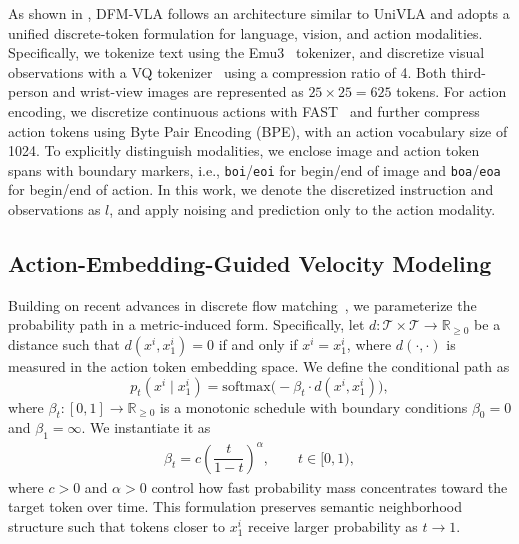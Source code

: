 As shown in , 
DFM-VLA follows an architecture similar to UniVLA and adopts a unified discrete-token formulation for language, vision, and action modalities.
Specifically, we tokenize text using the Emu3~\citep{wang2024emu3} tokenizer, and discretize visual observations with a VQ tokenizer~\citep{zheng2022movq} using a compression ratio of 4. Both third-person and wrist-view images are represented as $25\times25=625$ tokens. For action encoding, we discretize continuous actions with FAST~\citep{pertsch2025fast} and further compress action tokens using Byte Pair Encoding (BPE), with an action vocabulary size of 1024. 
To explicitly distinguish modalities, we enclose image and action token spans with boundary markers, i.e., \texttt{boi}/\texttt{eoi} for begin/end of image and \texttt{boa}/\texttt{eoa} for begin/end of action.
In this work, we denote the discretized instruction and observations as $l$, and apply noising and prediction only to the action modality.

\subsection{Action-Embedding-Guided Velocity Modeling}
\label{sec:Embed_vel}

Building on recent advances in discrete flow matching~\citep{gat2024discrete,wang2025fudoki,deng2025uniform}, we parameterize the probability path in a metric-induced form. 
Specifically, let \( d : \mathcal{T} \times \mathcal{T} \to \mathbb{R}_{\geq 0} \) be a distance such that \( d(x^i, x_1^i) = 0 \) if and only if \( x^i = x_1^i \), where \( d(\cdot, \cdot) \) is measured in the action token embedding space. We define the conditional path as
\begin{equation}
p_t(x^i \mid x_1^i) = \mathrm{softmax}\big( -\beta_t \cdot d(x^i, x_1^i) \big),
\label{eq:diffusion-softmax}
\end{equation}
where $\beta_t:[0,1] \to \mathbb{R}_{\ge 0}$ is a monotonic schedule with boundary conditions $\beta_0 = 0$ and $\beta_1 = \infty$. We instantiate it as
\begin{align}\label{eq:beta_t}
\beta_t = c \left(\dfrac{t}{1-t}\right)^\alpha, \qquad t \in [0,1),
\end{align}
where $c>0$ and $\alpha>0$ control how fast probability mass concentrates toward the target token over time. 
This formulation preserves semantic neighborhood structure such that tokens closer to $x_1^i$ receive larger probability as $t \to 1$.

